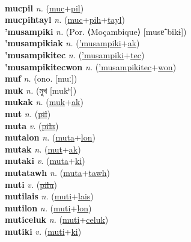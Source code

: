  \label{mucpatolon} \\
\textbf{mucpil} \textit{n.} (\hyperref[muc]{muc}+\hyperref[pil]{pil})
 \label{mucpil} \\
\textbf{mucpihtayl} \textit{n.} (\hyperref[muc]{muc}+\hyperref[pih]{pih}+\hyperref[tayl]{tayl})
 \label{mucpihtayl} \\
\textbf{'musampiki} \textit{n.} (Por. ⟨Moçambique⟩ [musɐ̃ˈbikɨ])
 \label{'musampiki} \\
\textbf{'musampikiak} \textit{n.} (\hyperref['musampiki]{'musampiki}+\hyperref[ak]{ak})
 \label{'musampikiak} \\
\textbf{'musampikitec} \textit{n.} (\hyperref['musampiki]{'musampiki}+\hyperref[tec]{tec})
 \label{'musampikitec} \\
\textbf{'musampikitecwon} \textit{n.} (\hyperref['musampikitec]{'musampikitec}+\hyperref[won]{won})
 \label{'musampikitecwon} \\
\textbf{muf} \textit{n.} (ono. [muː])
 \label{muf} \\
\textbf{muk} \textit{n.} ({\bengali{}মুখ} [mukʰ])
 \label{muk} \\
\textbf{mukak} \textit{n.} (\hyperref[muk]{muk}+\hyperref[ak]{ak})
 \label{mukak} \\
\textbf{mut} \textit{n.} (\hyperref[pil]{\sout{pil}})
 \label{mut} \\
\textbf{muta} \textit{v.} (\hyperref[pila]{\sout{pila}})
 \label{muta} \\
\textbf{mutalon} \textit{n.} (\hyperref[muta]{muta}+\hyperref[lon]{lon})
 \label{mutalon} \\
\textbf{mutak} \textit{n.} (\hyperref[mut]{mut}+\hyperref[ak]{ak})
 \label{mutak} \\
\textbf{mutaki} \textit{v.} (\hyperref[muta]{muta}+\hyperref[ki]{ki})
 \label{mutaki} \\
\textbf{mutatawh} \textit{n.} (\hyperref[muta]{muta}+\hyperref[tawh]{tawh})
 \label{mutatawh} \\
\textbf{muti} \textit{v.} (\hyperref[pilu]{\sout{pilu}})
 \label{muti} \\
\textbf{mutilais} \textit{n.} (\hyperref[muti]{muti}+\hyperref[lais]{lais})
 \label{mutilais} \\
\textbf{mutilon} \textit{n.} (\hyperref[muti]{muti}+\hyperref[lon]{lon})
 \label{mutilon} \\
\textbf{muticeluk} \textit{n.} (\hyperref[muti]{muti}+\hyperref[celuk]{celuk})
 \label{muticeluk} \\
\textbf{mutiki} \textit{v.} (\hyperref[muti]{muti}+\hyperref[ki]{ki})
